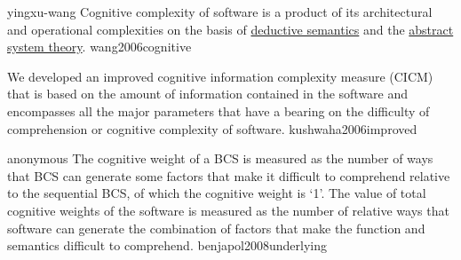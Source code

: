 \documentclass{article}
\begin{document}
\qte
  {yingxu-wang}
  {Cognitive complexity of software is a product of its architectural and operational complexities on the basis of \ul{deductive semantics} and the \ul{abstract system theory}.}
  {wang2006cognitive}

  {We developed an improved cognitive information complexity measure (CICM) that is based on the amount of information contained in the software and encompasses all the major parameters that have a bearing on the difficulty of comprehension or cognitive complexity of software.}
  {kushwaha2006improved}


\qte
  {anonymous}
  {The cognitive weight of a BCS is measured as the number of ways that BCS can generate some factors that make it difficult to comprehend relative to the sequential BCS, of which the cognitive weight is `1'. The value of total cognitive weights of the software is measured as the number of relative ways that software can generate the combination of factors that make the function and semantics difficult to comprehend.}
  {benjapol2008underlying}
\end{document}
